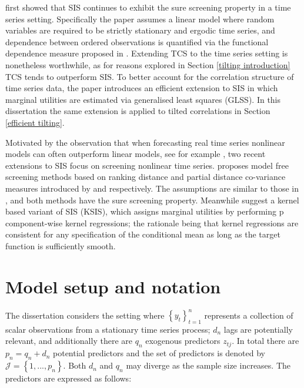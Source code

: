 \documentclass[11pt]{report}\usepackage[utf8]{inputenc}
\begin{document}
\cite{yousuf2018variable} first showed that SIS continues to exhibit the sure screening property in a time series setting. Specifically the paper assumes a linear model where random variables are required to be strictly stationary and ergodic time series, and dependence between ordered observations is quantified via the functional dependence measure proposed in \cite{wu2005nonlinear}. Extending TCS to the time series setting is nonetheless worthwhile, as for reasons explored in Section \ref{tilting introduction} TCS tends to outperform SIS. To better account for the correlation structure of time series data, the paper introduces an efficient extension to SIS in which marginal utilities are estimated via generalised least squares (GLSS). In this dissertation the same extension is applied to tilted correlations in Section \ref{efficient tilting}. 

Motivated by the observation that when forecasting real time series nonlinear models can often outperform linear models, see for example \cite{terasvirta2010modelling}, two recent extensions to SIS focus on screening nonlinear time series. \cite{yousuf2018partial} proposes model free screening methods based on ranking distance and partial distance co-variance measures introduced by \cite{szekely2007measuring} and \cite{szekely2014partial} respectively. The assumptions are similar to those in \cite{yousuf2018variable}, and both methods have the sure screening property. Meanwhile \cite{chen2018semiparametric} suggest a kernel based variant of SIS (KSIS), which assigns marginal utilities by performing p component-wise kernel regressions; the rationale being that kernel regressions are consistent for any specification of the conditional mean as long as the target function is sufficiently smooth. 

\section{Model setup and notation} \label{setup}

The dissertation considers the setting where $\left \{ y_t \right \}_{t=1}^{n}$ represents a collection of scalar observations from a stationary time series process; $d_n$ lags are potentially relevant, and additionally there are $q_n$ exogenous predictors $z_{tj}$. In total there are $p_n = q_n + d_n$ potential predictors and the set of predictors is denoted by $\mathcal{J} = \left \{ 1, ..., p_n \right \}$. Both $d_n$ and $q_n$ may diverge as the sample size increases. The predictors are expressed as follows:
\end{document}
